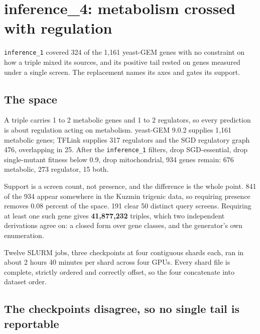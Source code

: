 
\section{inference\_4: metabolism crossed with regulation}

\texttt{inference\_1} covered 324 of the 1{,}161 yeast-GEM genes with no constraint
on how a triple mixed its sources, and its positive tail rested on genes measured
under a single screen. The replacement names its axes and gates its support.

\subsection{The space}

A triple carries 1 to 2 metabolic genes and 1 to 2 regulators, so every prediction
is about regulation acting on metabolism. yeast-GEM 9.0.2 supplies 1{,}161
metabolic genes; TFLink supplies 317 regulators and the SGD regulatory graph 476,
overlapping in 25. After the \texttt{inference\_1} filters, drop SGD-essential,
drop single-mutant fitness below 0.9, drop mitochondrial, 934 genes remain: 676
metabolic, 273 regulator, 15 both.

Support is a screen count, not presence, and the difference is the whole point.
841 of the 934 appear somewhere in the Kuzmin trigenic data, so requiring presence
removes 0.08 percent of the space. 191 clear 50 distinct query screens. Requiring
at least one such gene gives \textbf{41{,}877{,}232} triples, which two independent
derivations agree on: a closed form over gene classes, and the generator's own
enumeration.

Twelve SLURM jobs, three checkpoints at four contiguous shards each, ran in about
2 hours 40 minutes per shard across four GPUs. Every shard file is complete,
strictly ordered and correctly offset, so the four concatenate into dataset order.

\subsection{The checkpoints disagree, so no single tail is reportable}

